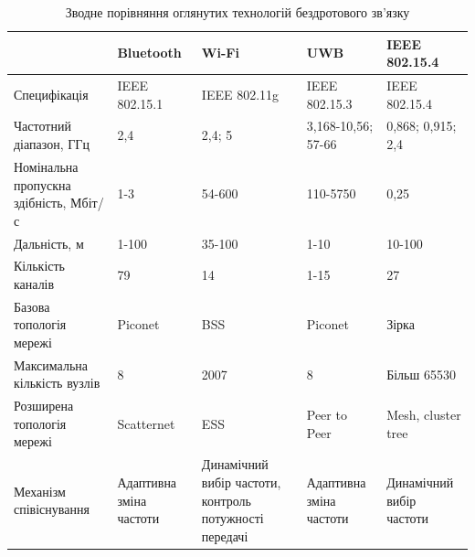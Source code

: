 \documentclass[a4paper,ukrainian,utf8,nocolumnsxix,floatsection,equationsection]{eskdtext}
\begin{document}
\begin{table}[htbp]
\caption{Зводне порівняння оглянутих технологій бездротового зв’язку}
\begin{tabular}{|p{}|p{}|p{}|p{}|p{}|}
\hline
                                       & Bluetooth               & Wi-Fi                                                  & UWB                     & IEEE 802.15.4            \\ \hline
Специфікація                           & IEEE 802.15.1 	         & IEEE 802.11g                                           & IEEE 802.15.3           & IEEE 802.15.4            \\ \hline
Частотний діапазон, ГГц                & 2,4                     & 2,4; 5                                                 & 3,168-10,56; 57-66      & 0,868; 0,915; 2,4        \\ \hline
Номінальна пропускна здібність, Мбіт/с & 1-3                     & 54-600                                                 & 110-5750                & 0,25                     \\ \hline
Дальність, м                           & 1-100                   & 35-100                                                 & 1-10                    & 10-100                   \\ \hline
Кількість каналів                      & 79                      & 14                                                     & 1-15                    & 27                       \\ \hline
Базова топологія мережі                & Piconet                 & BSS                                                    & Piconet                 & Зірка                    \\ \hline
Максимальна кількість вузлів           & 8                       & 2007                                                   & 8                       & Більш 65530              \\ \hline
Розширена топологія мережі             & Scatternet              & ESS                                                    & Peer to Peer            & Mesh, cluster tree       \\ \hline
Механізм співіснування                 & Адаптивна зміна частоти & Динамічний вибір частоти, контроль потужності передачі & Адаптивна зміна частоти & Динамічний вибір частоти \\ \hline

\end{tabular}

\label{tbl:wireless_tech_comparison}

\end{table}
\end{document}
